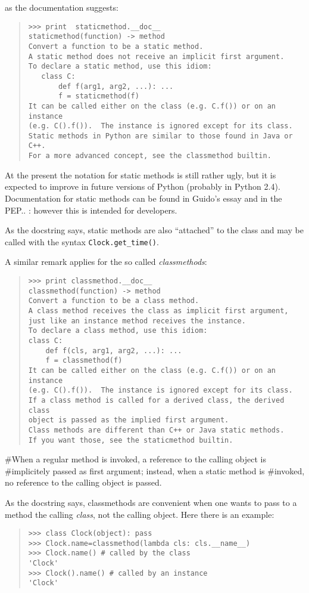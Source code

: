 \documentclass[10pt,english]{article}
\begin{document}
as the documentation suggests:
\begin{quote}
\begin{verbatim}>>> print  staticmethod.__doc__
staticmethod(function) -> method
Convert a function to be a static method.
A static method does not receive an implicit first argument.
To declare a static method, use this idiom:
   class C:
       def f(arg1, arg2, ...): ...
       f = staticmethod(f)
It can be called either on the class (e.g. C.f()) or on an instance
(e.g. C().f()).  The instance is ignored except for its class.
Static methods in Python are similar to those found in Java or C++.
For a more advanced concept, see the classmethod builtin.\end{verbatim}
\end{quote}

At the present the notation for static methods is still rather ugly,
but it is expected to improve in future versions of Python (probably
in Python 2.4). Documentation for static methods can
be found in Guido's essay and in the PEP.. : however this is intended for
developers.

As the docstring says, static methods are also ``attached'' to the
class and may be called with the syntax \texttt{Clock.get{\_}time()}.

A similar remark applies for the so called \emph{classmethods}:
\begin{quote}
\begin{verbatim}>>> print classmethod.__doc__
classmethod(function) -> method
Convert a function to be a class method.
A class method receives the class as implicit first argument,
just like an instance method receives the instance.
To declare a class method, use this idiom:
class C:
    def f(cls, arg1, arg2, ...): ...
    f = classmethod(f)
It can be called either on the class (e.g. C.f()) or on an instance
(e.g. C().f()).  The instance is ignored except for its class.
If a class method is called for a derived class, the derived class
object is passed as the implied first argument.
Class methods are different than C++ or Java static methods.
If you want those, see the staticmethod builtin.\end{verbatim}
\end{quote}

{\#}When a regular method is invoked, a reference to the calling object is 
{\#}implicitely passed as first argument; instead, when a static method is 
{\#}invoked, no reference to the calling object is passed.

As the docstring says, classmethods are convenient when one wants to pass 
to a method the calling \emph{class}, not the calling object. Here there is an 
example:
\begin{quote}
\begin{verbatim}>>> class Clock(object): pass
>>> Clock.name=classmethod(lambda cls: cls.__name__)
>>> Clock.name() # called by the class
'Clock'
>>> Clock().name() # called by an instance
'Clock'\end{verbatim}
\end{quote}
\end{document}

